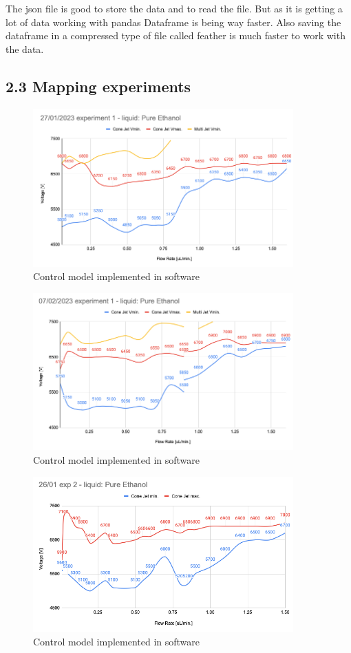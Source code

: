     The json file is good to store the data and to read the file. But as it is getting a lot of data working with pandas Dataframe is being way faster. Also saving the dataframe in a compressed
    type of file called feather is much faster to work with the data.




\subsection*{2.3 Mapping experiments}



    \begin{figure}[H]
        \center
        \includegraphics[width=10cm]{images/image_folder_report_4/manualMap1.png}
        \caption{Control model implemented in software}
    \end{figure}

    \begin{figure}[H]
        \center
        \includegraphics[width=10cm]{images/image_folder_report_4/manualMap2.png}
        \caption{Control model implemented in software}
    \end{figure}

    \begin{figure}[H]
        \center
        \includegraphics[width=10cm]{images/image_folder_report_4/manualMap3.png}
        \caption{Control model implemented in software}
    \end{figure}


